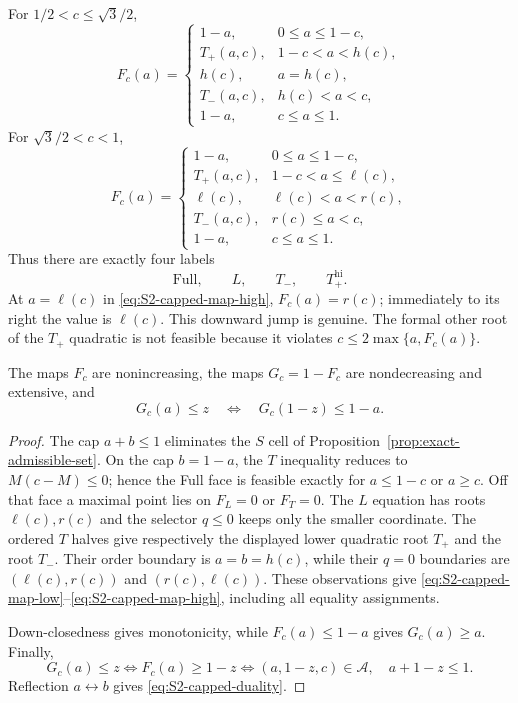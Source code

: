 \begin{proposition}
\label{prop:capped-demand-map}
For $1/2<c\le\sqrt3/2$,
\begin{equation}
 F_c(a)=
 \begin{cases}
  1-a,&0\le a\le1-c,\\
  T_+(a,c),&1-c<a<h(c),\\
  h(c),&a=h(c),\\
  T_-(a,c),&h(c)<a<c,\\
  1-a,&c\le a\le1.
 \end{cases}
 \label{eq:S2-capped-map-low}
\end{equation}
For $\sqrt3/2<c<1$,
\begin{equation}
 F_c(a)=
 \begin{cases}
  1-a,&0\le a\le1-c,\\
  T_+(a,c),&1-c<a\le\ell(c),\\
  \ell(c),&\ell(c)<a<r(c),\\
  T_-(a,c),&r(c)\le a<c,\\
  1-a,&c\le a\le1.
 \end{cases}
 \label{eq:S2-capped-map-high}
\end{equation}
Thus there are exactly four labels
\[
 \mathrm{Full},\qquad L,\qquad T_-,\qquad T_+^{\mathrm{hi}}.
\]
At $a=\ell(c)$ in \eqref{eq:S2-capped-map-high},
$F_c(a)=r(c)$; immediately to its right the value is $\ell(c)$.  This
downward jump is genuine.  The formal other root of the $T_+$ quadratic is
not feasible because it violates $c\le2\max\{a,F_c(a)\}$.

The maps $F_c$ are nonincreasing, the maps $G_c=1-F_c$ are nondecreasing
and extensive, and
\begin{equation}
 G_c(a)\le z\quad\Longleftrightarrow\quad
 G_c(1-z)\le1-a.
 \label{eq:S2-capped-duality}
\end{equation}
\end{proposition}

\begin{proof}
The cap $a+b\le1$ eliminates the $S$ cell of
Proposition~\ref{prop:exact-admissible-set}.  On the cap $b=1-a$, the $T$
inequality reduces to $M(c-M)\le0$; hence the Full face is feasible exactly
for $a\le1-c$ or $a\ge c$.  Off that face a maximal point lies on $F_L=0$
or $F_T=0$.  The $L$ equation has roots $\ell(c),r(c)$ and the selector
$q\le0$ keeps only the smaller coordinate.  The ordered $T$ halves give
respectively the displayed lower quadratic root $T_+$ and the root $T_-$.
Their order boundary is $a=b=h(c)$, while their $q=0$ boundaries are
$(\ell(c),r(c))$ and $(r(c),\ell(c))$.  These observations give
\eqref{eq:S2-capped-map-low}--\eqref{eq:S2-capped-map-high}, including all equality
assignments.

Down-closedness gives monotonicity, while $F_c(a)\le1-a$ gives
$G_c(a)\ge a$.  Finally,
\[
 G_c(a)\le z\iff F_c(a)\ge1-z
 \iff(a,1-z,c)\in\mathcal A,\quad a+1-z\le1.
\]
Reflection $a\leftrightarrow b$ gives \eqref{eq:S2-capped-duality}.
\end{proof}

